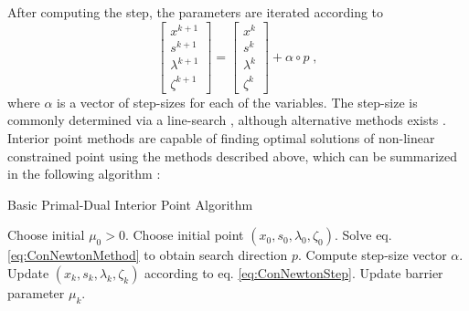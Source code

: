 After computing the step, the parameters are iterated according to 
\begin{equation}
\begin{bmatrix}
  x^{k+1} \\ s^{k+1} \\ \lambda^{k+1} \\ \zeta^{k+1} 
\end{bmatrix} 
=
\begin{bmatrix}
  x^{k} \\ s^{k} \\ \lambda^{k} \\ \zeta^{k} 
\end{bmatrix} 
+ \alpha \circ p \; ,
\label{eq:ConNewtonStep}
\end{equation}
where $\alpha$ is a vector of step-sizes for each of the variables. The step-size is commonly determined via a line-search \cite{Wachter2005,Fletcher2002}, although alternative methods exists \cite{Coleman1996}.\\
Interior point methods are capable of finding optimal solutions of non-linear constrained point using the methods described above, which can be summarized in the following algorithm \cite{wright}:
\begin{algorithm}
\begin{algorithmic}
\caption{Basic Primal-Dual Interior Point Algorithm}
\State Choose initial $\mu_0 > 0$.
\State Choose initial point $(x_0 , s_0 ,  \lambda_0 , \zeta_0)$.
		\State Solve eq. \eqref{eq:ConNewtonMethod} to obtain search direction $p$.
		\State Compute step-size vector $\alpha$.
		\State Update $(x_k , s_k ,  \lambda_k , \zeta_k)$ according to eq. \eqref{eq:ConNewtonStep}.
	\EndWhile
	\State Update barrier parameter $\mu_k$.
\EndWhile
\end{algorithmic}
\end{algorithm}

